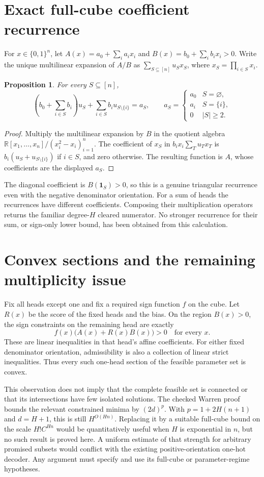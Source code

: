 \documentclass[11pt]{article}
\newtheorem{proposition}{Proposition}
\begin{document}
\section{Exact full-cube coefficient recurrence}
For $x\in\{0,1\}^n$, let
$A(x)=a_0+\sum_i a_ix_i$ and $B(x)=b_0+\sum_i b_ix_i>0$.
Write the unique multilinear expansion of $A/B$ as
$\sum_{S\subseteq[n]}u_S x_S$, where $x_S=\prod_{i\in S}x_i$.
\begin{proposition}
For every $S\subseteq[n]$,
\[
 \left(b_0+\sum_{i\in S}b_i\right)u_S
       +\sum_{i\in S}b_i u_{S\setminus\{i\}}=a_S,
 \qquad
 a_S=\begin{cases}a_0&S=\varnothing,\\a_i&S=\{i\},\\0&|S|\geq2.
 \end{cases}
\]
\end{proposition}
\begin{proof}
Multiply the multilinear expansion by $B$ in the quotient algebra
$\mathbb R[x_1,\ldots,x_n]/(x_i^2-x_i)_{i=1}^n$.
The coefficient of $x_S$ in $b_ix_i\sum_Tu_Tx_T$ is
$b_i(u_S+u_{S\setminus\{i\}})$ if $i\in S$, and zero otherwise.
The resulting function is $A$, whose coefficients are the displayed $a_S$.
\end{proof}
The diagonal coefficient is $B(\mathbf1_S)>0$, so this is a genuine
triangular recurrence even with the negative denominator orientation.
For a sum of heads the recurrences have different coefficients.
Composing their multiplication operators returns the familiar
degree-$H$ cleared numerator. No stronger recurrence for their sum, or
sign-only lower bound, has been obtained from this calculation.

\section{Convex sections and the remaining multiplicity issue}
Fix all heads except one and fix a required sign function $f$ on the cube.
Let $R(x)$ be the score of the fixed heads and the bias. On the region
$B(x)>0$, the sign constraints on the remaining head are exactly
\[
 f(x)\bigl(A(x)+R(x)B(x)\bigr)>0\quad\text{for every }x.
\]
These are linear inequalities in that head's affine coefficients.
For either fixed denominator orientation, admissibility is also a
collection of linear strict inequalities. Thus every such one-head
section of the feasible parameter set is convex.

This observation does not imply that the complete feasible set is
connected or that its intersections have few isolated solutions.
The checked Warren proof bounds the relevant constrained minima by
$(2d)^p$. With $p=1+2H(n+1)$ and $d=H+1$, this is still
$H^{O(Hn)}$. Replacing it by a suitable full-cube bound on the scale
$H!C^{Hn}$ would be quantitatively useful when $H$ is exponential in
$n$, but no such result is proved here. A uniform estimate of that
strength for arbitrary promised subsets would conflict with the
existing positive-orientation one-hot decoder. Any argument must
specify and use its full-cube or parameter-regime hypotheses.
\end{document}
